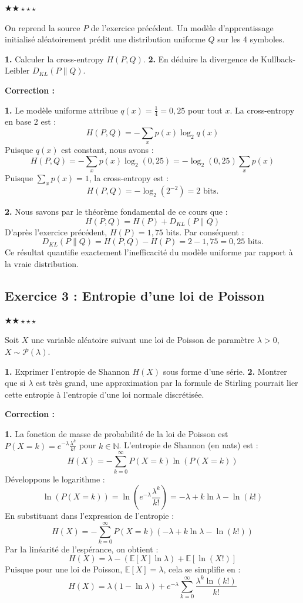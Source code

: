 \documentclass[11pt,a4paper]{article}
\begin{document}
$\bigstar\bigstar\star\star\star$


On reprend la source $P$ de l'exercice précédent. Un modèle d'apprentissage initialisé aléatoirement prédit une distribution uniforme $Q$ sur les 4 symboles.

\textbf{1.} Calculer la cross-entropy $H(P, Q)$.
\textbf{2.} En déduire la divergence de Kullback-Leibler $D_{KL}(P \| Q)$.

\textbf{Correction :}

\textbf{1.} Le modèle uniforme attribue $q(x) = \frac{1}{4} = 0,25$ pour tout $x$.
La cross-entropy en base 2 est :
$$H(P, Q) = - \sum_{x} p(x) \log_2 q(x)$$
Puisque $q(x)$ est constant, nous avons :
$$H(P, Q) = - \sum_{x} p(x) \log_2(0,25) = - \log_2(0,25) \sum_{x} p(x)$$
Puisque $\sum_x p(x) = 1$, la cross-entropy est :
$$H(P, Q) = - \log_2(2^{-2}) = 2 \text{ bits}.$$

\textbf{2.} Nous savons par le théorème fondamental de ce cours que :
$$H(P, Q) = H(P) + D_{KL}(P \| Q)$$
D'après l'exercice précédent, $H(P) = 1,75$ bits. Par conséquent :
$$D_{KL}(P \| Q) = H(P, Q) - H(P) = 2 - 1,75 = 0,25 \text{ bits}.$$
Ce résultat quantifie exactement l'inefficacité du modèle uniforme par rapport à la vraie distribution.


\subsection*{Exercice 3 : Entropie d'une loi de Poisson }

$\bigstar\bigstar\star\star\star$


Soit $X$ une variable aléatoire suivant une loi de Poisson de paramètre $\lambda > 0$, $X \sim \mathcal{P}(\lambda)$.

\textbf{1.} Exprimer l'entropie de Shannon $H(X)$ sous forme d'une série.
\textbf{2.} Montrer que si $\lambda$ est très grand, une approximation par la formule de Stirling pourrait lier cette entropie à l'entropie d'une loi normale discrétisée.

\textbf{Correction :}

\textbf{1.} La fonction de masse de probabilité de la loi de Poisson est $P(X=k) = e^{-\lambda} \frac{\lambda^k}{k!}$ pour $k \in \mathbb{N}$.
L'entropie de Shannon (en nats) est :
$$H(X) = - \sum_{k=0}^{\infty} P(X=k) \ln(P(X=k))$$
Développons le logarithme :
$$\ln(P(X=k)) = \ln(e^{-\lambda} \frac{\lambda^k}{k!}) = -\lambda + k \ln \lambda - \ln(k!)$$
En substituant dans l'expression de l'entropie :
$$H(X) = - \sum_{k=0}^{\infty} P(X=k) (-\lambda + k \ln \lambda - \ln(k!))$$
Par la linéarité de l'espérance, on obtient :
$$H(X) = \lambda - (\mathbb{E}[X] \ln \lambda) + \mathbb{E}[\ln(X!)]$$
Puisque pour une loi de Poisson, $\mathbb{E}[X] = \lambda$, cela se simplifie en :
$$H(X) = \lambda(1 - \ln \lambda) + e^{-\lambda} \sum_{k=0}^{\infty} \frac{\lambda^k \ln(k!)}{k!}$$
\end{document}
